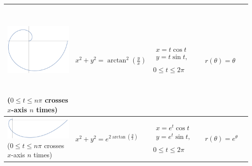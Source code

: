 \documentclass[12pt]{article}
\begin{document}
\begin{center}
\begin{tabular}{|C{2.75in}|C{1.625in}|C{1.625in}|C{1.625in}|N}
		\hline
		\includegraphics[trim={0 -4.5mm 0 -4.5mm}, clip, height=1.875in]{3_Spiral} \newline ($0\leq t\leq n\pi$ crosses $x$-axis $n$ times) \vspace{3mm} &
		$x^2+y^2=\arctan^2\left(\frac{y}{x}\right)$ & 
		$\begin{array}{c}
		x=t\cos{t}\\
		y=t\sin{t},\\[6mm]
		\end{array}$ $0\leq t\leq 2\pi$ \vspace{-10mm} & 
		$r(\theta)=\theta$ & \\
		
		\hline
		\includegraphics[trim={0 -14mm 0 -14mm}, clip, width=2.75in]{3_Spiral2} \newline ($0\leq t\leq n\pi$ crosses $x$-axis $n$ times) \vspace{3mm} &
		$x^2+y^2=e^{2\arctan\left(\frac{y}{x}\right)}$ & 
		$\begin{array}{c}
		x=e^t\cos{t}\\
		y=e^t\sin{t},\\[6mm]
		\end{array}$ $0\leq t\leq 2\pi$ \vspace{-10mm} & 
		$r(\theta)=e^\theta$ & \\
		
		\hline
	\end{tabular}
	\end{center}
\end{document}
